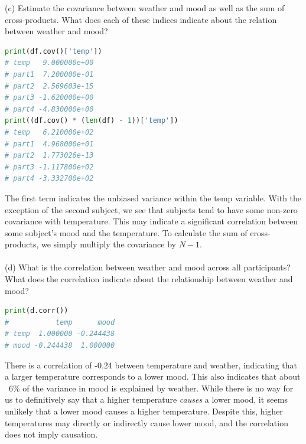 \documentclass[onecolumn,10pt]{jhwhw}
\begin{document}
\noindent (c) Estimate the covariance between weather and mood as well as the sum of cross-products. What does each of these indices indicate about the relation between weather and mood?
\begin{lstlisting}[language=Python]
print(df.cov()['temp'])
# temp   9.000000e+00
# part1  7.200000e-01
# part2  2.569603e-15
# part3 -1.620000e+00
# part4 -4.830000e+00
print((df.cov() * (len(df) - 1))['temp'])
# temp   6.210000e+02
# part1  4.968000e+01
# part2  1.773026e-13
# part3 -1.117800e+02
# part4 -3.332700e+02
\end{lstlisting}
The first term indicates the unbiased variance within the temp variable. With the exception of the second subject, we see that subjects tend to have some non-zero covariance with temperature. This may indicate a significant correlation between some subject's mood and the temperature. To calculate the sum of cross-products, we simply multiply the covariance by $N-1$.\\
\\
(d) What is the correlation between weather and mood across all participants? What does the correlation indicate about the relationship between weather and mood?
\begin{lstlisting}[language=Python]
print(d.corr())
#           temp      mood
# temp  1.000000 -0.244438
# mood -0.244438  1.000000
\end{lstlisting}
There is a correlation of -0.24 between temperature and weather, indicating that a larger temperature corresponds to a lower mood. This also indicates that about ~6\% of the variance in mood is explained by weather. While there is no way for us to definitively say that a higher temperature \textit{causes} a lower mood, it seems unlikely that a lower mood causes a higher temperature. Despite this, higher temperatures may directly or indirectly cause lower mood, and the correlation does not imply causation.\\
\end{document}
